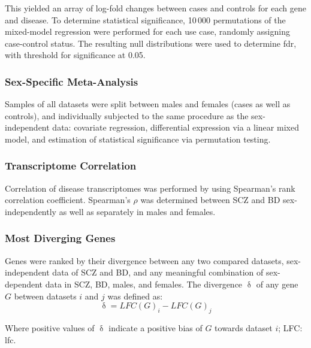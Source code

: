 \begin{method}
This yielded an array of log-fold changes between cases and controls for each gene and disease. To determine statistical significance, 10\,000 permutations of the mixed-model regression were performed for each use case, randomly assigning case-control status. The resulting null distributions were used to determine \ac{fdr}, with threshold for significance at 0.05. 

\subsubsection{Sex-Specific Meta-Analysis}
Samples of all datasets were split between males and females (cases as well as controls), and individually subjected to the same procedure as the sex-independent data: covariate regression, differential expression via a linear mixed model, and estimation of statistical significance via permutation testing.

\subsubsection{Transcriptome Correlation}
Correlation of disease transcriptomes was performed by using Spearman's rank correlation coefficient. Spearman's $\rho$ was determined between SCZ and BD sex-independently as well as separately in males and females.

\subsubsection{Most Diverging Genes}
Genes were ranked by their divergence between any two compared datasets, sex-independent data of SCZ and BD, and any meaningful combination of sex-dependent data in SCZ, BD, males, and females. The divergence $\updelta$ of any gene $G$ between datasets $i$ and $j$ was defined as: $$\updelta = LFC(G)_i - LFC(G)_j$$

Where positive values of $\updelta$ indicate a positive bias of $G$ towards dataset $i$; LFC: \acl{lfc}.

\end{method}

